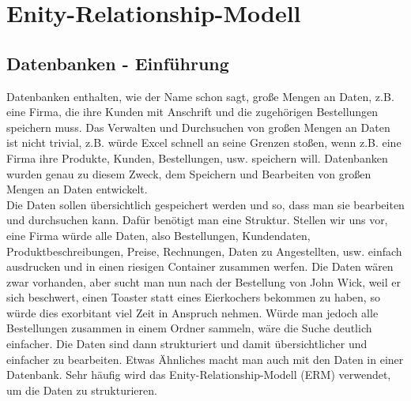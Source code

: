 \section[Enity-Relationship-Modell]{Enity-Relationship-Modell}
\subsection[Datenbanken]{Datenbanken - Einführung}
Datenbanken enthalten, wie der Name schon sagt, große Mengen an Daten, z.B. eine Firma, die ihre Kunden mit Anschrift und die zugehörigen Bestellungen speichern muss. Das Verwalten und Durchsuchen von großen Mengen an Daten ist nicht trivial, z.B. würde Excel schnell an seine Grenzen stoßen, wenn z.B. eine Firma ihre Produkte, Kunden, Bestellungen, usw. speichern will. Datenbanken wurden genau zu diesem Zweck, dem Speichern und Bearbeiten von großen Mengen an Daten entwickelt.\\
Die Daten sollen übersichtlich gespeichert werden und so, dass man sie bearbeiten und durchsuchen kann. Dafür benötigt man eine Struktur. Stellen wir uns vor, eine Firma würde alle Daten, also Bestellungen, Kundendaten, Produktbeschreibungen, Preise, Rechnungen, Daten zu Angestellten, usw. einfach ausdrucken und in einen riesigen Container zusammen werfen. Die Daten wären zwar vorhanden, aber sucht man nun nach der Bestellung von John Wick, weil er sich beschwert, einen Toaster statt eines Eierkochers bekommen zu haben, so würde dies exorbitant viel Zeit in Anspruch nehmen. Würde man jedoch alle Bestellungen zusammen in einem Ordner sammeln, wäre die Suche deutlich einfacher. Die Daten sind dann strukturiert und damit übersichtlicher und einfacher zu bearbeiten. Etwas Ähnliches macht man auch mit den Daten in einer Datenbank. Sehr häufig wird das Enity-Relationship-Modell (ERM) verwendet, um die Daten zu strukturieren.
